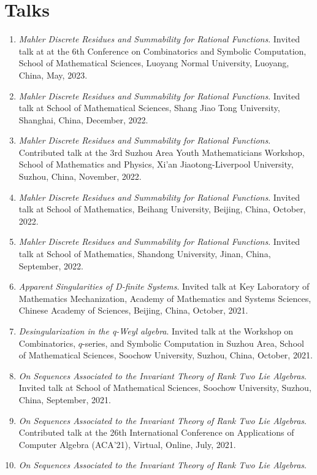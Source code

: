 \documentclass[a4paper,12pt]{article}
\begin{document}
\section*{\Large{Talks}}
\begin{enumerate}
\item {\em Mahler Discrete Residues and Summability for Rational Functions}. 
Invited talk at at the 6th Conference on Combinatorics and Symbolic Computation, School of Mathematical Sciences, Luoyang Normal University, Luoyang, China, May, 2023. 
\item {\em Mahler Discrete Residues and Summability for Rational Functions}. 
Invited talk at School of Mathematical Sciences, Shang Jiao Tong University, Shanghai, China, December, 2022. 
\item {\em Mahler Discrete Residues and Summability for Rational Functions}. 
Contributed talk at the 3rd Suzhou Area Youth Mathematicians Workshop, School of Mathematics and Physics, Xi'an Jiaotong-Liverpool  University, Suzhou, China, November, 2022. 
\item {\em Mahler Discrete Residues and Summability for Rational Functions}. 
Invited talk at School of Mathematics, Beihang University, Beijing, China, October, 2022. 
\item {\em Mahler Discrete Residues and Summability for Rational Functions}. 
Invited talk at School of Mathematics, Shandong University, Jinan, China, September, 2022. 
\item {\em Apparent Singularities of D-finite Systems}.
Invited talk at Key Laboratory of Mathematics Mechanization, Academy of Mathematics and Systems Sciences,
 Chinese Academy of Sciences, Beijing, China, October, 2021. 
 \item {\em Desingularization in the q-Weyl algebra}. 
 Invited talk at the Workshop on Combinatorics, $q$-series, and Symbolic Computation in Suzhou Area, School of Mathematical Sciences, Soochow University, Suzhou, China, October, 2021.
\item {\em On Sequences Associated to the Invariant Theory of Rank Two Lie Algebras}.
Invited talk at School of Mathematical Sciences, Soochow University, Suzhou, 
China, September, 2021.
\item {\em On Sequences Associated to the Invariant Theory of Rank Two Lie Algebras}.
Contributed talk at the 26th International Conference on Applications of Computer Algebra (ACA'21), Virtual, Online, July, 2021.
\item {\em On Sequences Associated to the Invariant Theory of Rank Two Lie Algebras}.

\end{enumerate}
\end{document}
